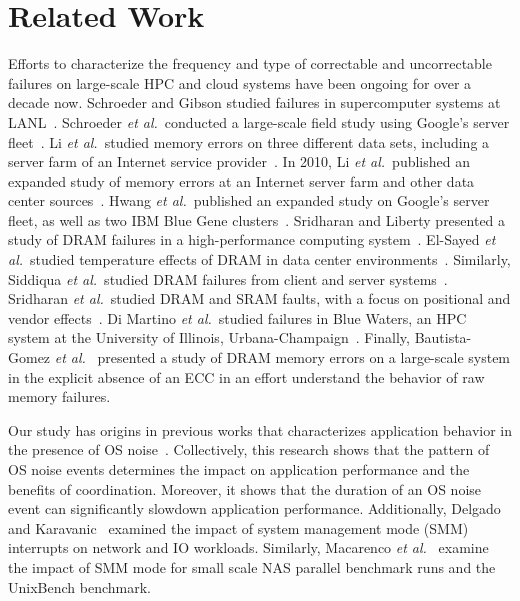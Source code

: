 
\section{Related Work}
\label{sec:related}



Efforts to characterize the frequency and type of correctable and uncorrectable
failures on large-scale HPC and cloud systems have been ongoing for over a
decade now.  Schroeder and Gibson studied failures in supercomputer systems at
LANL~\cite{Schroeder:2006:Large-scale}.  Schroeder {\it et al.}~conducted a
large-scale field study using Google's server fleet~\cite{Schroeder09}.  Li {\it
et al.}~studied memory errors on three different data sets, including a server
farm of an Internet service provider~\cite{Li07}.  In 2010, Li {\it et
al.}~published an expanded study of memory errors at an Internet server farm and
other data center sources~\cite{Li10}.  Hwang {\it et al.}~published an expanded
study on Google's server fleet, as well as two IBM Blue Gene
clusters~\cite{Hwang12}.  Sridharan and Liberty presented a study of DRAM
failures in a high-performance computing system~\cite{Sridharan12}.  El-Sayed
{\it et al.}~studied temperature effects of DRAM in data center
environments~\cite{Elsayed12}.  Similarly, Siddiqua {\it et al.}~studied DRAM
failures from client and server systems~\cite{Siddiqua13}.  Sridharan {\it et
al.}~studied DRAM and SRAM faults, with a focus on positional and vendor
effects~\cite{Sridharan13}.  Di Martino {\it et al.}~studied failures in Blue
Waters, an HPC system at the University of Illinois,
Urbana-Champaign~\cite{bluewaters}.  Finally, Bautista-Gomez {\it et
al.}~\cite{Bautista-Gomez:2016:Unprotected} presented a study of DRAM memory
errors on a large-scale system in the explicit absence of an ECC in an effort
understand the behavior of raw memory failures.

Our study has origins in previous works that characterizes application behavior
in the presence of OS
noise~\cite{Ferreira:2008:Characterizing,Hoefler:2010:Characterizing}.
Collectively, this research shows that the pattern of OS noise events determines
the impact on application performance and the benefits of coordination.
Moreover, it shows that the duration of an OS noise event can significantly
slowdown application performance.  Additionally, Delgado and
Karavanic~\cite{Delgado:2013:SMM} examined the impact of system management mode
(SMM) interrupts on network and IO workloads.  Similarly, Macarenco {\it et
al.}~\cite{Macarenco:2016:Effects} examine the impact of SMM mode for small
scale NAS parallel benchmark runs and the UnixBench benchmark.


